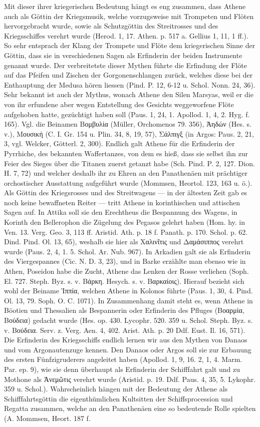 \documentclass[a4paper, 11pt, oneside]{article}
\begin{document}
Mit dieser ihrer kriegerischen Bedeutung hängt es eng zusammen, dass Athene auch als Göttin der Kriegsmusik, welche vorzugsweise mit Trompeten und Flöten hervorgebracht wurde, sowie als Schutzgöttin des Streitrosses und des Kriegsschiffes verehrt wurde (Herod. 1, 17. Athen. p. 517 a. Gellius 1, 11, 1 ff.). So sehr entsprach der Klang der Trompete und Flöte dem kriegerischen Sinne der Göttin, dass sie in verschiedenen Sagen als Erfinderin der beiden Instrumente genannt wurde. Der verbreitetste dieser Mythen führte die Erfindung der Flöte auf das Pfeifen und Zischen der Gorgonenschlangen zurück, welches diese bei der Enthauptung der Medusa hören liessen (Pind. P. 12, 6-12 u. Schol. Nonn. 24, 36). Sehr bekannt ist auch der Mythus, wonach Athene den Silen Marsyas, weil er die von ihr erfundene aber wegen Entstellung des Gesichts weggeworfene Flöte aufgehoben hatte, gezüchtigt haben soll (Paus. 1, 24, 1. Apollod. 1, 4, 2. Hyg. f. 165). Vgl. die Beinamen Βομβυλία (Müller, Orchomenos 79. 356), Ἀηδών (Hes. s. v.), Μουσική (C. I. Gr. 154 u. Plin. 34, 8, 19, 57), Σάλπιγξ (in Argos: Paus. 2, 21, 3, vgl. Welcker, Götterl. 2, 300). Endlich galt Athene für die Erfinderin der Pyrrhiche, des bekannten Waffertanzes, von dem es hieß, dass sie selbst ihn zur Feier des Sieges über die Titanen zuerst getanzt habe (Sch. Pind. P. 2, 127. Dion. H. 7, 72) und welcher deshalb ihr zu Ehren an den Panathenäen mit prächtiger orchostischer Ausstattung aufgeführt wurde (Mommsen, Heortol. 123, 163 u. ö.). Als Göttin des Kriegsrosses und des Streitwagens --- in der ältesten Zeit gab es noch keine bewaffneten Reiter --- tritt Athene in korinthischen und attischen Sagen auf. In Attika soll sie den Erechtheus die Bespannung des Wagens, in Korinth den Bellerophon die Zügelung des Pegasos gelehrt haben (Hom. hy. in Ven. 13. Verg. Geo. 3, 113 ff. Aristid. Ath. p. 18 f. Panath. p. 170. Schol. p. 62. Dind. Pind. Ol. 13, 65), weshalb sie hier als Χαλινῖτις und Δαμάσιππος verehrt wurde (Paus. 2, 4, 1. 5. Schol. Ar. Nub. 967). In Arkadien galt sie als Erfinderin des Viergespannes (Cic. N. D. 3, 23), und in Barke erzählte man ebenso wie in Athen, Poseidon habe die Zucht, Athene das Lenken der Rosse verliehen (Soph. El. 727. Steph. Byz. s. v. Βάρκη. Hesych. s. v. Βαρκαίοις). Hierauf bezieht sich wohl der Beiname Ἰππία, welchen Athene in Kolonos führte (Paus. 1, 30, 4. Pind. Ol. 13, 79. Soph. O. C. 1071). In Zusammenhang damit steht es, wenn Athene in Böotien und Thessalien als Bespannerin oder Erfinderin des Pfluges (Βοαρμία, Βούδεια) gedacht wurde (Hes. op. 430. Lycophr. 520. 359 u. Schol. Steph. Byz. s. v. Βούδεια. Serv. z. Verg. Aen. 4, 402. Arist. Ath. p. 20 Ddf. Eust. Il. 16, 571). Die Erfinderin des Kriegsschiffs endlich lernen wir aus den Mythen von Danaos und vom Argonautenzuge kennen. Den Danaos oder Argos soll sie zur Erbauung des ersten Fünfzigruderers angeleitet haben (Apollod. 1, 9, 16. 2, 1, 4. Marm. Par. ep. 9), wie sie denn überhaupt als Erfinderin der Schifffahrt galt und zu Mothone als Ἀνεμῶτις verehrt wurde (Aristid. p. 19. Ddf. Paus. 4, 35, 5. Lykophr. 359 u. Schol.). Wahrscheinlich hängen mit der Bedeutung der Athene als Schifffahrtsgöttin die eigenthümlichen Kultsitten der Schiffsprocession und Regatta zusammen, welche an den Panathenäen eine so bedeutende Rolle spielten (A. Mommsen, Heort. 187 f. 
\end{document}
